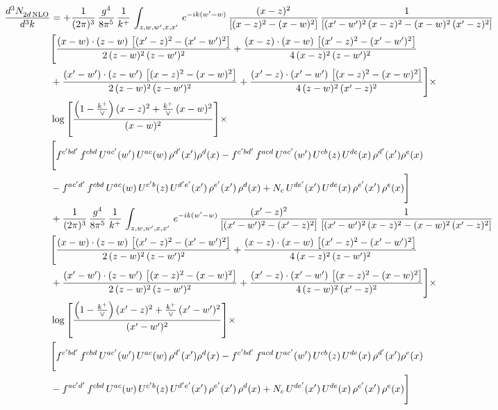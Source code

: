 \documentclass[9pt]{article}
\numberwithin{equation}{section}
\begin{document}
\begin{align}
 \frac{d^{3}N_{2d\,\rm NLO}^{\rm}}{d^{3}k}  & =   +\frac{1}{(2\pi)^{3}}\, \frac{g^{4}}{8\pi^{5}}\,\frac{1}{k^{+}}\,\int_{z,w,w^{\prime},x,x'}\, e^{-ik(w^{\prime}-w)}\,\frac{(x-z)^{2}}{\left[(x-z)^{2}-(x-w)^{2}\right]}\,\frac{1}{\left[(x'-w')^{2}\,(x-z)^{2} - (x-w)^{2}\,(x'-z)^{2}\right]}\notag \\ & \Bigg[\frac{(x-w)\cdot (z-w)\, \left[(x'-z)^{2}-(x'-w')^{2}\right]}{2\, (z-w)^{2}\, (z-w')^{2}}  + \frac{(x-z)\cdot (x-w)\,\left[(x'-z)^{2}-(x'-w')^{2}\right] }{4\,(x-z)^{2}\,(z-w')^{2}}\notag \\ & +\frac{(x'-w')\cdot (z-w')\, \left[(x-z)^{2}-(x-w)^{2}\right]}{2\, (z-w)^{2}\, (z-w')^{2}}+ \frac{(x'-z)\cdot (x'-w')\, \left[(x-z)^{2}-(x-w)^{2}\right]}{4\, (z-w)^{2}\,(x'-z)^{2}}\Bigg]\times\,\notag \\ & \log{\left[\frac{\left(1-\frac{k^{+}}{\vee}\right)(x-z)^{2}+\frac{k^{+}}{\vee}\,(x-w)^{2}}{(x-w)^{2}}\right]} \times\notag \\ & \Bigg[f^{c'bd'}\,f^{cbd}\, U^{ac'}(w')\,U^{ac}(w)\,\rho^{d'}(x')\rho^{d}(x)- f^{c'bd'}\,f^{acd}\,U^{ac'}(w')\,U^{cb}(z)\,U^{de}(x)\,\rho^{d'}(x')\rho^{e}(x) \notag \\ & -f^{ac'd'}\,f^{cbd}\,U^{ac}(w)\,U^{c'b}(z)\,U^{d'e'}(x')\,\rho^{e'}(x')\,\rho^{d}(x) +N_{c}\,U^{de'}(x')\,U^{de}(x)\,\rho^{e'}(x')\,\rho^{e}(x)\Bigg] \notag \\
& +\frac{1}{(2\pi)^{3}}\, \frac{g^{4}}{8\pi^{5}}\,\frac{1}{k^{+}}\,\int_{z,w,w^{\prime},x,x'}\, e^{-ik(w^{\prime}-w)}\,\frac{(x'-z)^{2}}{\left[(x'-w')^{2}-(x'-z)^{2}\right]}\,\frac{1}{\left[(x'-w')^{2}\,(x-z)^{2} - (x-w)^{2}\,(x'-z)^{2}\right]}\notag \\ & \Bigg[\frac{(x-w)\cdot (z-w)\, \left[(x'-z)^{2}-(x'-w')^{2}\right]}{2\, (z-w)^{2}\, (z-w')^{2}}  + \frac{(x-z)\cdot (x-w)\,\left[(x'-z)^{2}-(x'-w')^{2}\right] }{4\,(x-z)^{2}\,(z-w')^{2}}\notag \\ & +\frac{(x'-w')\cdot (z-w')\, \left[(x-z)^{2}-(x-w)^{2}\right]}{2\, (z-w)^{2}\, (z-w')^{2}}+ \frac{(x'-z)\cdot (x'-w')\, \left[(x-z)^{2}-(x-w)^{2}\right]}{4\, (z-w)^{2}\,(x'-z)^{2}}\Bigg]\times\,\notag \\ & \log{\left[\frac{\left(1-\frac{k^{+}}{\vee}\right)(x'-z)^{2}+\frac{k^{+}}{\vee}\,(x'-w')^{2}}{(x'-w')^{2}}\right]} \times\notag \\ & \Bigg[f^{c'bd'}\,f^{cbd}\, U^{ac'}(w')\,U^{ac}(w)\,\rho^{d'}(x')\rho^{d}(x)- f^{c'bd'}\,f^{acd}\,U^{ac'}(w')\,U^{cb}(z)\,U^{de}(x)\,\rho^{d'}(x')\rho^{e}(x) \notag \\ & -f^{ac'd'}\,f^{cbd}\,U^{ac}(w)\,U^{c'b}(z)\,U^{d'e'}(x')\,\rho^{e'}(x')\,\rho^{d}(x) +N_{c}\,U^{de'}(x')\,U^{de}(x)\,\rho^{e'}(x')\,\rho^{e}(x)\Bigg]
\end{align}
\end{document}
